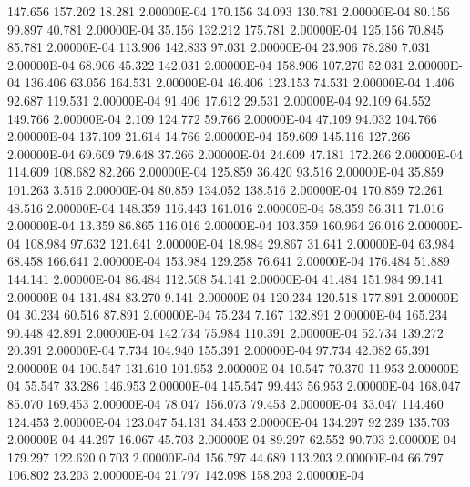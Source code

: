    147.656   157.202    18.281  2.00000E-04
   170.156    34.093   130.781  2.00000E-04
    80.156    99.897    40.781  2.00000E-04
    35.156   132.212   175.781  2.00000E-04
   125.156    70.845    85.781  2.00000E-04
   113.906   142.833    97.031  2.00000E-04
    23.906    78.280     7.031  2.00000E-04
    68.906    45.322   142.031  2.00000E-04
   158.906   107.270    52.031  2.00000E-04
   136.406    63.056   164.531  2.00000E-04
    46.406   123.153    74.531  2.00000E-04
     1.406    92.687   119.531  2.00000E-04
    91.406    17.612    29.531  2.00000E-04
    92.109    64.552   149.766  2.00000E-04
     2.109   124.772    59.766  2.00000E-04
    47.109    94.032   104.766  2.00000E-04
   137.109    21.614    14.766  2.00000E-04
   159.609   145.116   127.266  2.00000E-04
    69.609    79.648    37.266  2.00000E-04
    24.609    47.181   172.266  2.00000E-04
   114.609   108.682    82.266  2.00000E-04
   125.859    36.420    93.516  2.00000E-04
    35.859   101.263     3.516  2.00000E-04
    80.859   134.052   138.516  2.00000E-04
   170.859    72.261    48.516  2.00000E-04
   148.359   116.443   161.016  2.00000E-04
    58.359    56.311    71.016  2.00000E-04
    13.359    86.865   116.016  2.00000E-04
   103.359   160.964    26.016  2.00000E-04
   108.984    97.632   121.641  2.00000E-04
    18.984    29.867    31.641  2.00000E-04
    63.984    68.458   166.641  2.00000E-04
   153.984   129.258    76.641  2.00000E-04
   176.484    51.889   144.141  2.00000E-04
    86.484   112.508    54.141  2.00000E-04
    41.484   151.984    99.141  2.00000E-04
   131.484    83.270     9.141  2.00000E-04
   120.234   120.518   177.891  2.00000E-04
    30.234    60.516    87.891  2.00000E-04
    75.234     7.167   132.891  2.00000E-04
   165.234    90.448    42.891  2.00000E-04
   142.734    75.984   110.391  2.00000E-04
    52.734   139.272    20.391  2.00000E-04
     7.734   104.940   155.391  2.00000E-04
    97.734    42.082    65.391  2.00000E-04
   100.547   131.610   101.953  2.00000E-04
    10.547    70.370    11.953  2.00000E-04
    55.547    33.286   146.953  2.00000E-04
   145.547    99.443    56.953  2.00000E-04
   168.047    85.070   169.453  2.00000E-04
    78.047   156.073    79.453  2.00000E-04
    33.047   114.460   124.453  2.00000E-04
   123.047    54.131    34.453  2.00000E-04
   134.297    92.239   135.703  2.00000E-04
    44.297    16.067    45.703  2.00000E-04
    89.297    62.552    90.703  2.00000E-04
   179.297   122.620     0.703  2.00000E-04
   156.797    44.689   113.203  2.00000E-04
    66.797   106.802    23.203  2.00000E-04
    21.797   142.098   158.203  2.00000E-04

